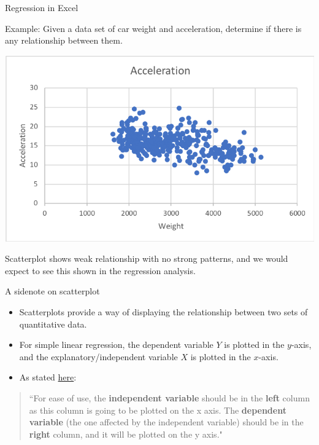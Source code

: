 \documentclass[xcolor=svgnames, handout]{beamer}
\begin{document}
\begin{frame}[label=current]{Regression in Excel}
\begin{exampleblock}{
Example:} Given a data set of car weight and acceleration, determine if there is any relationship between them.\end{exampleblock}

\begin{center}
\includegraphics[height=.45\textheight]{avsw2}
\end{center}
Scatterplot shows weak relationship with no strong patterns, and we would expect to see this shown in the regression analysis.
\end{frame}

\begin{frame}{A sidenote on scatterplot}
\begin{itemize}
\item Scatterplots provide a way of displaying  the relationship between two sets of quantitative data.
\medskip
\item For simple linear regression, the dependent variable $Y$ is plotted in the $y$-axis, and the explanatory/independent variable $X$ is plotted in the $x$-axis. 
\medskip
\item As stated \href{https://www.ablebits.com/office-addins-blog/2018/10/03/make-scatter-plot-excel/}{here}:
\end{itemize}
\begin{quote}
``For ease of use, the {\bf independent variable} should be in the {\bf left} column as this column is going to be plotted on the x axis. The {\bf dependent variable} (the one affected by the independent variable) should be in the {\bf right} column, and it will be plotted on the y axis."
\end{quote}
\end{frame}
\end{document}
